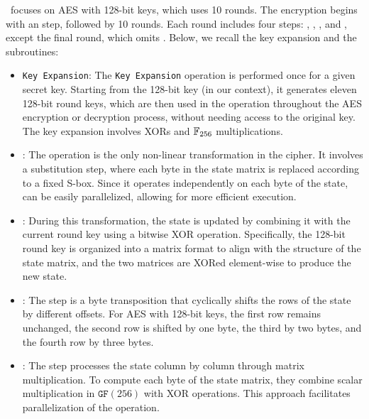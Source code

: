 \hippo~focuses on \gls{AES} with 128-bit keys, which uses 10 rounds. The encryption begins with an \AddRoundKey step, followed by 10 rounds. Each round includes four steps: \SubBytes, \ShiftRows, \MixColumns, and \AddRoundKey, except the final round, which omits \MixColumns. Below, we recall the key expansion and the subroutines:
\begin{itemize}
\item \texttt{Key Expansion}: The \texttt{Key Expansion} operation is performed once for a given secret key. Starting from the 128-bit key (in our context), it generates eleven 128-bit round keys, which are then used in the \AddRoundKey operation throughout the \gls{AES} encryption or decryption process, without needing access to the original key. The key expansion involves XORs and $\mathbb{F}_{256}$ multiplications.

    \item \SubBytes: The \SubBytes operation is the only non-linear transformation in the cipher. It involves a substitution step, where each byte in the state matrix is replaced according to a fixed \gls{S-box}. Since it operates independently on each byte of the state, \SubBytes can be easily parallelized, allowing for more efficient execution.
    \item \AddRoundKey: 
    During this transformation, the state is updated by combining it with the current round key using a bitwise XOR operation. Specifically, the 128-bit round key is organized into a matrix format to align with the structure of the state matrix, and the two matrices are XORed element-wise to produce the new state.
   
    \item \ShiftRows: The \ShiftRows step is a byte transposition that cyclically shifts the rows of the state by different offsets. For \gls{AES} with 128-bit keys, the first row remains unchanged, the second row is shifted by one byte, the third by two bytes, and the fourth row by three bytes. 

    \item \MixColumns: The \MixColumns step processes the state column by column through matrix multiplication. To compute each byte of the state matrix, they combine scalar multiplication in $\mathtt{GF}(256)$ with XOR operations. This approach facilitates parallelization of the operation.  
    
    
\end{itemize}

